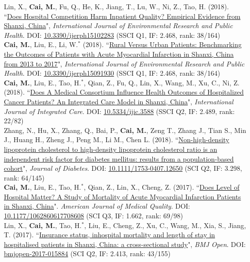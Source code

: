 \documentclass[11pt, a4paper]{article}
\newcommand{\years}[1]{\marginnote{\scriptsize #1}}
\begin{document}
\years{2018}Lin, X., \textbf{Cai, M.}, Fu, Q., He, K., Jiang, T., Lu, W., Ni, Z., Tao, H. (2018). ``\ul{Does Hospital Competition Harm Inpatient Quality? Empirical Evidence from Shanxi, China}", \emph{International Journal of Environmental Research and Public Health}. DOI: \href{https://doi.org/10.3390/ijerph15102283}{10.3390/ijerph15102283} (SSCI Q1, IF: 2.468, rank: 38/164)\\[6pt]
\years{2018}\textbf{Cai, M.}, Liu, E., Li, W.$^\ast$ (2018). ``\ul{Rural Versus Urban Patients: Benchmarking the Outcomes of Patients with Acute Myocardial Infarction in Shanxi, China from 2013 to 2017}", \emph{International Journal of Environmental Research and Public Health}. DOI: \href{https://doi.org/10.3390/ijerph15091930}{10.3390/ijerph15091930} (SSCI Q1, IF: 2.468, rank: 38/164)\\[6pt]
\years{2018}\textbf{Cai, M.}, Liu, E., Tao, H.$^\ast$, Qian, Z., Fu, Q., Lin, X., Wang, M., Xu, C., Ni, Z. (2018). ``\ul{Does A Medical Consortium Influence Health Outcomes of Hospitalized Cancer Patients? An Integrated Care Model in Shanxi, China}", \emph{International Journal of Integrated Care}. DOI: \href{https://doi.org/10.5334/ijic.3588}{10.5334/ijic.3588} (SSCI Q2, IF: 2.489, rank: 22/82)\\[6pt]
\years{2018}Zhang, N., Hu, X., Zhang, Q., Bai, P., \textbf{Cai, M.}, Zeng T., Zhang J., Tian S., Min J., Huang H., Zheng J., Peng M., Li M., Chen L. (2018). ``\ul{Non-high-density lipoprotein cholesterol to high-density lipoprotein cholesterol ratio is an independent risk factor for diabetes mellitus: results from a population-based cohort}", \emph{Journal of Diabetes}. DOI: \href{https://doi.org/10.1111/1753-0407.12650}{10.1111/1753-0407.12650} (SCI Q2, IF: 3.298, rank: 64/145)\\[6pt]
\years{2017}\textbf{Cai, M.}, Liu, E., Tao, H.$^\ast$, Qian, Z., Lin, X., Cheng, Z. (2017). ``\ul{Does Level of Hospital Matter? A Study of Mortality of Acute Myocardial Infarction Patients in Shanxi, China}". \emph{American Journal of Medical Quality}. DOI: \href{https://doi.org/10.1177/1062860617708608}{10.1177/1062860617708608} (SCI Q3, IF: 1.662, rank: 69/98)\\[6pt]
\years{2017}Lin, X., \textbf{Cai, M.}, Tao, H.$^\ast$, Liu, E., Cheng, Z., Xu, C., Wang, M., Xia, S., Jiang, T. (2017). ``\ul{Insurance status, inhospital mortality and length of stay in hospitalised patients in Shanxi, China: a cross-sectional study}", \emph{BMJ Open}. DOI: \href{https://doi.org/10.1136/bmjopen-2017-015884}{bmjopen-2017-015884} (SCI Q2, IF: 2.413, rank: 43/155)\\[6pt]
\end{document}
